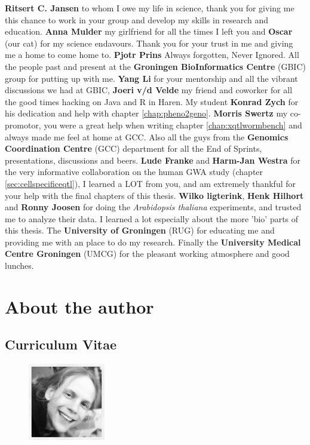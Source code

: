 {\bf Ritsert C. Jansen} to whom I owe my life in science, thank you for giving 
me this chance to work in your group and develop my skills in research and 
education. {\bf Anna Mulder} my girlfriend for all the times I left you and 
{\bf Oscar} (our cat) for my science endavours. Thank you for your trust in 
me and giving me a home to come home to. {\bf Pjotr Prins} Always forgotten, Never 
Ignored. All the people past and present at the {\bf Groningen BioInformatics Centre} 
(GBIC) group for putting up with me. {\bf Yang Li} for your mentorship and all 
the vibrant discussions we had at GBIC, {\bf Joeri v/d Velde} my friend and coworker 
for all the good times hacking on Java and R in Haren. My student {\bf Konrad Zych} 
for his dedication and help with chapter \ref{chap:pheno2geno}. {\bf Morris Swertz} 
my co-promotor, you were a great help when writing chapter \ref{chap:xqtlwormbench} 
and always made me feel at home at GCC. Also all the guys from the {\bf Genomics Coordination 
Centre} (GCC) department for all the End of Sprints, presentations, discussions and beers. 
{\bf Lude Franke} and {\bf Harm-Jan Westra} for the very informative collaboration on the 
human GWA study (chapter \ref{sec:cellspecificeqtl}), I learned a LOT from you, and am 
extremely thankful for your help with the final chapters of this thesis. {\bf Wilko ligterink}, 
{\bf Henk Hilhort} and {\bf Ronny Joosen} for doing the \emph{Arabidopsis thaliana} 
experiments, and trusted me to analyze their data. I learned a lot especially about 
the more 'bio' parts of this thesis. The {\bf University of Groningen} (RUG) for 
educating me and providing me with an place to do my research. Finally the {\bf 
University Medical Centre Groningen} (UMCG) for the pleasant working atmosphere 
and good lunches.

\newpage

\section*{About the author}
\subsection*{Curriculum Vitae}

\begin{figure}
  \centering
  \includegraphics[width=0.3\textwidth]{eps/image_6_1.eps}
\end{figure}

